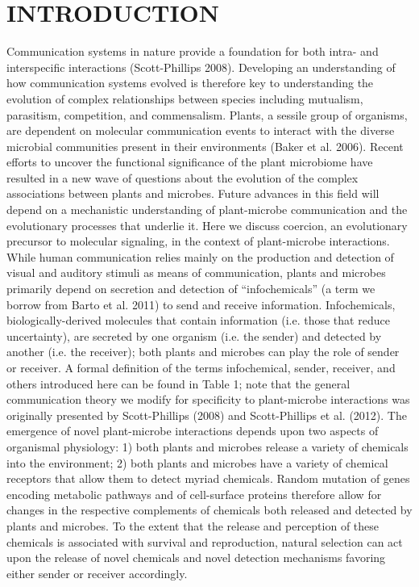 \documentclass[PhD]{msu-thesis}
\begin{document}
\section{INTRODUCTION} 
Communication systems in nature provide a foundation for both intra- and interspecific interactions (Scott-Phillips 2008). Developing an understanding of how communication systems evolved is therefore key to understanding the evolution of complex relationships between species including mutualism, parasitism, competition, and commensalism. Plants, a sessile group of organisms, are dependent on molecular communication events to interact with the diverse microbial communities present in their environments (Baker et al. 2006). Recent efforts to uncover the functional significance of the plant microbiome have resulted in a new wave of questions about the evolution of the complex associations between plants and microbes. Future advances in this field will depend on a mechanistic understanding of plant-microbe communication and the evolutionary processes that underlie it. Here we discuss coercion, an evolutionary precursor to molecular signaling, in the context of plant-microbe interactions.
While human communication relies mainly on the production and detection of visual and auditory stimuli as means of communication, plants and microbes primarily depend on secretion and detection of “infochemicals” (a term we borrow from Barto et al. 2011) to send and receive information. Infochemicals, biologically-derived molecules that contain information (i.e. those that reduce uncertainty), are secreted by one organism (i.e. the sender) and detected by another (i.e. the receiver); both plants and microbes can play the role of sender or receiver. A formal definition of the terms infochemical, sender, receiver, and others introduced here can be found in Table 1; note that the general communication theory we modify for specificity to plant-microbe interactions was originally presented by Scott-Phillips (2008) and Scott-Phillips et al. (2012). The emergence of novel plant-microbe interactions depends upon two aspects of organismal physiology: 1) both plants and microbes release a variety of chemicals into the environment; 2) both plants and microbes have a variety of chemical receptors that allow them to detect myriad chemicals. Random mutation of genes encoding metabolic pathways and of cell-surface proteins therefore allow for changes in the respective complements of chemicals both released and detected by plants and microbes. To the extent that the release and perception of these chemicals is associated with survival and reproduction, natural selection can act upon the release of novel chemicals and novel detection mechanisms favoring either sender or receiver accordingly. 
\end{document}
